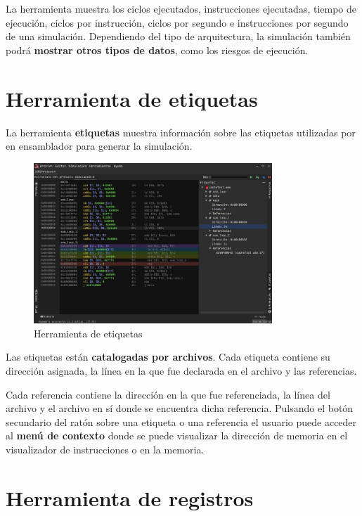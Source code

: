 \noindent La herramienta muestra los ciclos ejecutados,
instrucciones ejecutadas, tiempo de ejecución, ciclos por instrucción,
ciclos por segundo e instrucciones por segundo de una simulación.
Dependiendo del tipo de arquitectura, la simulación también podrá
\textbf{mostrar otros tipos de datos}, como los riesgos de ejecución.

\section{Herramienta de etiquetas}\label{sec:herramienta-de-etiquetas}

La herramienta \textbf{etiquetas} muestra información sobre las etiquetas
utilizadas por en ensamblador para generar la simulación.

\begin{figure}[H]
    \centering
    \includegraphics[width=0.8\textwidth]{images/tools/jams-labels}
    \caption{Herramienta de etiquetas}
    \label{fig:jams-labels}
\end{figure}

\noindent Las etiquetas están \textbf{catalogadas por archivos}.
Cada etiqueta contiene su dirección asignada,
la línea en la que fue declarada en el archivo y las referencias.

Cada referencia contiene la dirección en la que fue referenciada,
la línea del archivo y el archivo en sí donde se encuentra dicha referencia.
Pulsando el botón secundario del ratón sobre una etiqueta
o una referencia el usuario puede acceder al \textbf{menú de contexto}
donde se puede visualizar la dirección de memoria en el visualizador
de instrucciones o en la memoria.

\section{Herramienta de registros}\label{sec:herramienta-de-registros}

